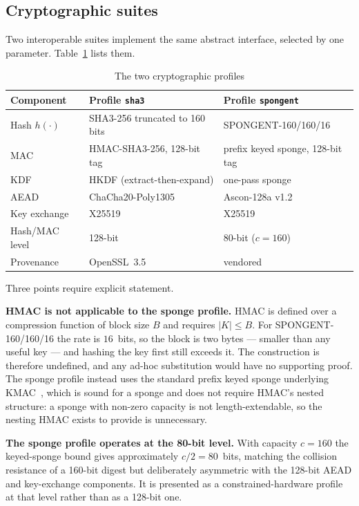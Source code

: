 \documentclass[11pt,a4paper]{article}
\begin{document}
\subsection{Cryptographic suites}

Two interoperable suites implement the same abstract interface, selected by one
parameter. Table~\ref{tab:suites} lists them.

\begin{table}[H]
\centering
\caption{The two cryptographic profiles}
\label{tab:suites}
\small
\begin{tabular}{@{}p{2.9cm}p{4.6cm}p{4.6cm}@{}}
\toprule
\textbf{Component} & \textbf{Profile \texttt{sha3}} & \textbf{Profile \texttt{spongent}} \\
\midrule
Hash $h(\cdot)$ & SHA3-256 truncated to 160 bits & SPONGENT-160/160/16 \\
MAC & HMAC-SHA3-256, 128-bit tag & prefix keyed sponge, 128-bit tag \\
KDF & HKDF (extract-then-expand) & one-pass sponge \\
AEAD & ChaCha20-Poly1305 & Ascon-128a v1.2 \\
Key exchange & X25519 & X25519 \\
Hash/MAC level & 128-bit & 80-bit ($c=160$) \\
Provenance & OpenSSL~3.5 & vendored \\
\bottomrule
\end{tabular}
\end{table}

Three points require explicit statement.

\textbf{HMAC is not applicable to the sponge profile.} HMAC is defined over a
compression function of block size $B$ and requires $|K|\le B$. For
SPONGENT-160/160/16 the rate is $16$~bits, so the block is two bytes --- smaller
than any useful key --- and hashing the key first still exceeds it. The
construction is therefore undefined, and any ad-hoc substitution would have no
supporting proof. The sponge profile instead uses the standard prefix keyed sponge
underlying KMAC~\cite{sha3_standard}, which is sound for a sponge and does not
require HMAC's nested structure: a sponge with non-zero capacity is not
length-extendable, so the nesting HMAC exists to provide is unnecessary.

\textbf{The sponge profile operates at the 80-bit level.} With capacity $c=160$
the keyed-sponge bound gives approximately $c/2 = 80$~bits, matching the
collision resistance of a 160-bit digest but deliberately asymmetric with the
128-bit AEAD and key-exchange components. It is presented as a constrained-hardware
profile at that level rather than as a 128-bit one.
\end{document}
